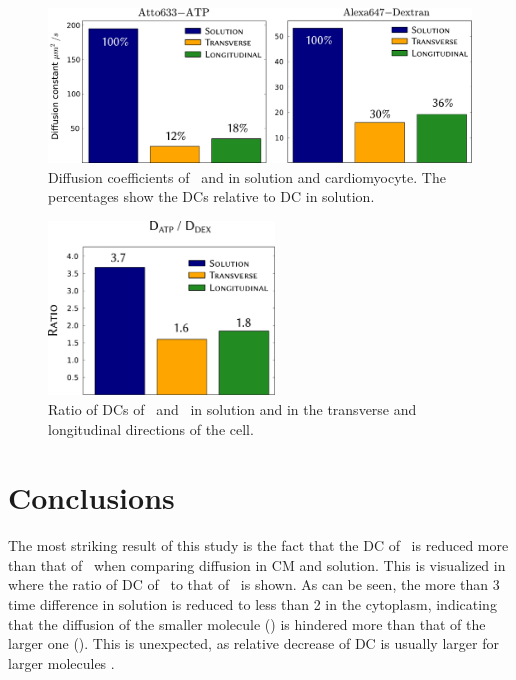 \begin{figure}
  \centering
    \includegraphics[width=12cm]{figures/d_atto_dex.pdf}
    \caption[Diffusion coefficients of \ATP\ and \DEX\ in solution and
    cardiomyocyte]{Diffusion coefficients of \ATP\ and \DEX in solution and
    cardiomyocyte. The percentages show the \acp{DC} relative to \ac{DC}
    in solution.}
  \label{fig:d_atto_dex}
\end{figure}
\begin{figure}[b!]
  \centering
    \includegraphics[width=6cm]{figures/ratio.pdf}
    \caption[Ratio of \aclp{DC} of \ATP\ and \DEX]{Ratio of \acp{DC} of
    \ATP\ and \DEX\ in solution and in the transverse and longitudinal
    directions of the cell.}
  \label{fig:ratio}
\end{figure}
\section{Conclusions}
The most striking result of this study is the fact that the \ac{DC} of
\ATP\ is reduced more than that of \DEX\ when comparing diffusion in
\ac{CM} and solution. This is visualized in \F{\ref{fig:ratio}} where the
ratio of \ac{DC} of \ATP\ to that of \DEX\ is shown. As can be seen, the more
than 3 time difference in solution is reduced to less than 2 in the
cytoplasm, indicating that the diffusion of the smaller molecule (\ATP)
is hindered more than that of the larger one (\DEX). This is unexpected,
as relative decrease of \ac{DC} is usually larger for
larger molecules \cite{Muramatsu_88_ProcNatlAcadSci_85_p2984}.

